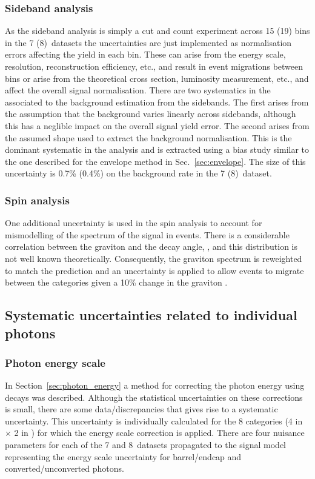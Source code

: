 \subsubsection{Sideband analysis}

As the sideband analysis is simply a cut and count experiment across 15 (19) bins in the 7 (8)~\TeV datasets the uncertainties are just implemented as normalisation errors affecting the yield in each bin. These can arise from the energy scale, resolution, reconstruction efficiency, etc., and result in event migrations between bins or arise from the theoretical cross section, luminosity measurement, etc., and affect the overall signal normalisation. There are two systematics in the \SMVA associated to the background estimation from the sidebands. The first arises from the assumption that the background varies linearly across sidebands, although this has a neglible impact on the overall signal yield error. The second arises from the assumed shape used to extract the background normalisation. This is the dominant systematic in the analysis and is extracted using a bias study similar to the one described for the envelope method in Sec.~\ref{sec:envelope}. The size of this uncertainty is 0.7\% (0.4\%) on the background rate in the 7 (8)~\TeV dataset.

\subsubsection{Spin analysis}

One additional uncertainty is used in the spin analysis to account for mismodelling of the \pT spectrum of the signal in \MC events. There is a considerable correlation between the graviton \pT and the decay angle, \costhetastar, and this distribution is not well known theoretically. Consequently, the graviton \pT spectrum is reweighted to match the \SM prediction and an uncertainty is applied to allow events to migrate between the \abscostheta categories given a 10\% change in the graviton \pT.

\subsection{Systematic uncertainties related to individual photons}

\subsubsection{Photon energy scale}
In Section~\ref{sec:photon_energy} a method for correcting the photon energy using \Zee decays was described. Although the statistical uncertainties on these corrections is small, there are some data/\MC discrepancies that gives rise to a systematic uncertainty. This uncertainty is individually calculated for the 8 categories (4 in \eta $\times$ 2 in \rnine) for which the energy scale correction is applied. There are four nuisance parameters for each of the 7 and 8~\TeV datasets propagated to the signal model representing the energy scale uncertainty for barrel/endcap and converted/unconverted photons.


